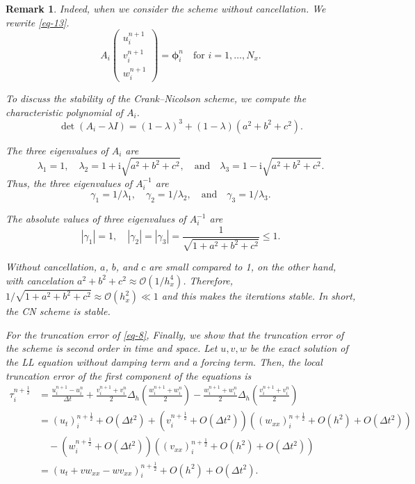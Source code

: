 \documentclass[preprint,times,3p]{elsarticle}
\newtheorem{remark}{Remark}
\begin{document}
\begin{remark}
Indeed, when we consider the scheme without cancellation. We rewrite \cref{eq-13}.
\[
A_i
\begin{pmatrix}
u_i^{n+1} \\
v_i^{n+1} \\
w_i^{n+1}
\end{pmatrix}
= \boldsymbol{\phi}_i^n
\quad \text{for } i = 1, \dots, N_x.
\]

To discuss the stability of the Crank--Nicolson scheme, we compute the characteristic polynomial of \(A_i\).
\[
\det(A_i - \lambda I) = (1 - \lambda)^3 + (1 - \lambda)(a^2 + b^2 + c^2).
\]

The three eigenvalues of \(A_i\) are
\[
\lambda_1 = 1, \quad
\lambda_2 = 1 + \mathrm{i}\sqrt{a^2 + b^2 + c^2}, \quad
\text{and} \quad
\lambda_3 = 1 - \mathrm{i}\sqrt{a^2 + b^2 + c^2}.
\]
Thus, the three eigenvalues of \(A_i^{-1}\) are
\[
\gamma_1 = 1/\lambda_1, \quad \gamma_2 = 1/\lambda_2, \quad \text{and} \quad \gamma_3 = 1/\lambda_3.
\]

The absolute values of three eigenvalues of \(A_i^{-1}\) are
\[
|\gamma_1| = 1, \quad |\gamma_2| = |\gamma_3| = \frac{1}{\sqrt{1 + a^2 + b^2 + c^2}} \leq 1.
\]

Without cancellation, \(a\), \(b\), and \(c\) are small compared to 1, on the other hand, with cancelation \(a^2 + b^2 + c^2 \approx \mathcal{O}(1/h_x^4)\).
Therefore, \(1/\sqrt{1 + a^2 + b^2 + c^2} \approx \mathcal{O}(h_x^2) \ll 1\) and this makes the iterations stable. In short, the CN scheme is stable.

For the truncation error of \cref{eq-8}, Finally, we show that the truncation error of the scheme is second order in time and space. Let \(u, v, w\) be the exact solution of the LL equation without damping term and a forcing term. Then, the local truncation error of the first component of the equations is
\begin{align*}
\tau_i^{n+\frac{1}{2}}
&= \frac{u_i^{n+1} - u_i^n}{\Delta t}
+ \frac{v_i^{n+1} + v_i^n}{2} \Delta_h\left( \frac{w_i^{n+1} + w_i^n}{2} \right)
- \frac{w_i^{n+1} + w_i^n}{2} \Delta_h\left( \frac{v_i^{n+1} + v_i^n}{2} \right) \\
&= (u_t)_i^{n+\frac{1}{2}} + O(\Delta t^2)
+ \left( v_i^{n+\frac{1}{2}} + O(\Delta t^2) \right)\left( (w_{xx})_i^{n+\frac{1}{2}} + O(h^2) + O(\Delta t^2) \right) \\
&\quad - \left( w_i^{n+\frac{1}{2}} + O(\Delta t^2) \right)\left( (v_{xx})_i^{n+\frac{1}{2}} + O(h^2) + O(\Delta t^2) \right) \\
&= \left( u_t + v w_{xx} - w v_{xx} \right)_i^{n+\frac{1}{2}} + O(h^2) + O(\Delta t^2).
\end{align*}


\end{remark}
\end{document}
